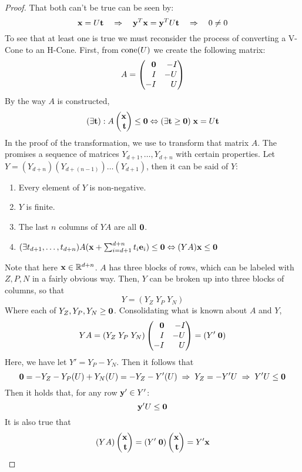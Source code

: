 \begin{proof}  That both can't be true can be seen by:
	\[ \mathbf{x} = U\mathbf{t} \quad\Rightarrow\quad \mathbf{y}^T\mathbf{x} = \mathbf{y}^T U\mathbf{t} \quad\Rightarrow\quad 0 \neq 0 \]
	To see that at least one is true we must reconsider the process of converting a V-Cone to an H-Cone.  First, from $\operatorname{cone}(U)$ we create the following matrix:
	\[ A = \begin{pmatrix*}[r] \0 & -I \\ I & -U \\ -I & U \end{pmatrix*}  \]
	By the way $A$ is constructed,
	\begin{equation}\label{eq:flcone}
		(\exists \t) : A \xt \leq \0 \Leftrightarrow (\exists \t\geq\0)\; \x = U\t
	\end{equation}
	In the proof of the transformation, we use  to transform that matrix $A$.  The  promises a sequence of matrices $Y_{d+1}, \dots, Y_{d+n}$ with certain properties.  Let $Y = (Y_{d+n})(Y_{d+(n-1)})\dots(Y_{d+1})$, then it can be said of $Y$:
	\begin{enumerate}
		\item Every element of $Y$ is non-negative.
		\item $Y$ is finite.
		\item The last $n$ columns of $YA$ are all $\mathbf{0}$.
		\item \((\exists t_{d+1},\dots,t_{d+n})A(\mathbf{x} + \sum_{i=d+1}^{d+n} t_i\mathbf{e}_i) \leq \mathbf{0}
		      \Leftrightarrow (YA)\mathbf{x} \leq \mathbf{0} \)
	\end{enumerate}
	Note that here $\mathbf{x} \in \mathbb{R}^{d+n}$.  $A$ has three blocks of rows, which can be labeled with $Z,P,N$ in a fairly obvious way.  Then, $Y$ can be broken up into three blocks of columns, so that
	\[ Y = (Y_Z \; Y_P \; Y_N) \]
	Where each of $Y_Z,Y_P,Y_N \geq \mathbf{0}$.  Consolidating what is known about $A$ and $Y$,
	\[ YA = (Y_Z \; Y_P \; Y_N) \begin{pmatrix*}[r] \0 & -I \\ I & -U \\ -I & U \end{pmatrix*}
		= (Y' \; \0) \]
	Here, we have let $Y' = Y_P - Y_N$.  Then it follows that
	\[ \mathbf{0} = -Y_Z - Y_P(U) + Y_N(U) = -Y_Z - Y'(U) \;\Rightarrow\; Y_Z = - Y'U
		\;\Rightarrow\; Y'U \leq \mathbf{0} \]
	Then it holds that, for any row $\mathbf{y}' \in Y'$:
	\begin{equation}\label{eq:flneg}
		\mathbf{y}'U \leq \mathbf{0}
	\end{equation}
	It is also true that
	\[ (YA)\xt = (Y'\;\0)\xt = Y'\x \]

\end{proof}
